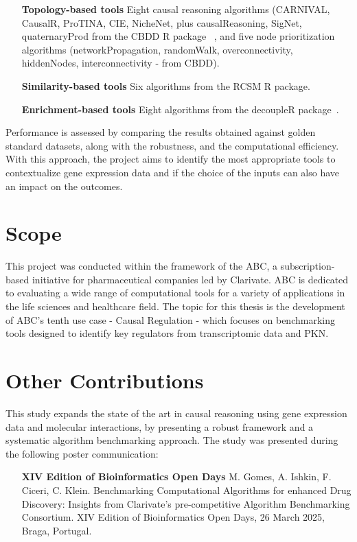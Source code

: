 \begin{enumerate}
\item[\textbf{Topology-based tools}] Eight causal reasoning algorithms (\gls{CARNIVAL}, CausalR, ProTINA, \gls{CIE}, NicheNet, plus causalReasoning, SigNet, quaternaryProd from the \gls{CBDD} \gls{R} package~\cite{RN36} , and five node prioritization algorithms (networkPropagation, randomWalk, overconnectivity, hiddenNodes, interconnectivity - from \gls{CBDD}). 
\item[\textbf{Similarity-based tools }] Six algorithms from the \gls{RCSM} R package.
\item[\textbf{Enrichment-based tools}] Eight algorithms from the decoupleR package~\cite{RN35}.
\end{enumerate}

Performance is assessed by comparing the results obtained against golden standard datasets, along with the robustness, and the computational efficiency. 
With this approach, the project aims to identify the most appropriate tools to contextualize gene expression data and if the choice of the inputs can also have an impact on the outcomes.

\section{Scope} %
\label{sec:scope}
This project was conducted within the framework of the \gls{ABC}, a subscription-based initiative for pharmaceutical companies led by Clarivate. \gls{ABC} is dedicated to evaluating a wide range of computational tools for a variety of applications in the life sciences and healthcare field. The topic for this thesis is the development of \gls{ABC}'s tenth use case - Causal Regulation - which focuses on benchmarking tools designed to identify key regulators from transcriptomic data and \gls{PKN}.

\section{Other Contributions} %
\label{sec:othercontributions}

This study expands the state of the art in causal reasoning using gene expression data and molecular interactions, by presenting a robust framework and a systematic algorithm benchmarking approach. The study was presented during the following poster communication:
\begin{enumerate}
\item[\textbf{XIV Edition of Bioinformatics Open Days}] M. Gomes, A. Ishkin, F. Ciceri, C. Klein. Benchmarking Computational Algorithms for enhanced Drug Discovery: Insights from Clarivate's pre-competitive Algorithm Benchmarking Consortium. XIV Edition of Bioinformatics Open Days, 26 March 2025, Braga, Portugal.
\end{enumerate}

